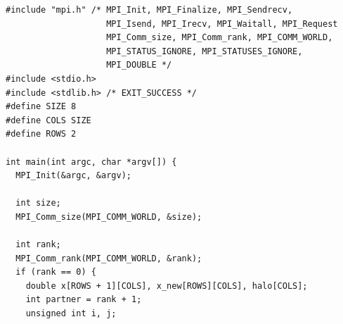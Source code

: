 \documentclass[12pt]{article}
\begin{document}
\newpage

\begin{verbatim}
#include "mpi.h" /* MPI_Init, MPI_Finalize, MPI_Sendrecv,
                    MPI_Isend, MPI_Irecv, MPI_Waitall, MPI_Request
                    MPI_Comm_size, MPI_Comm_rank, MPI_COMM_WORLD,
                    MPI_STATUS_IGNORE, MPI_STATUSES_IGNORE,
                    MPI_DOUBLE */
#include <stdio.h>
#include <stdlib.h> /* EXIT_SUCCESS */
#define SIZE 8
#define COLS SIZE
#define ROWS 2

int main(int argc, char *argv[]) {
  MPI_Init(&argc, &argv);

  int size;
  MPI_Comm_size(MPI_COMM_WORLD, &size);

  int rank;
  MPI_Comm_rank(MPI_COMM_WORLD, &rank);
  if (rank == 0) {
    double x[ROWS + 1][COLS], x_new[ROWS][COLS], halo[COLS];
    int partner = rank + 1;
    unsigned int i, j;


\end{verbatim}
\end{document}
